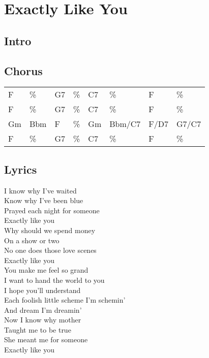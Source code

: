 \section{Exactly Like You}


\subsection*{Intro}


\subsection*{Chorus}


\begin{tabular}{l l l l l l l l}
F & \% & G7 & \% & C7 & \% & F & \% \\ 
F & \% & G7 & \% & C7 & \% & F & \% \\ 
Gm & Bbm & F & \% & Gm & Bbm/C7 & F/D7 & G7/C7 \\ 
F & \% & G7 & \% & C7 & \% & F & \% \\ 
\end{tabular}


\subsection*{Lyrics}


I know why I've waited \\ 
Know why I've been blue \\ 
Prayed each night for someone \\ 
Exactly like you \\ 

Why should we spend money \\ 
On a show or two \\ 
No one does those love scenes \\ 
Exactly like you \\ 

You make me feel so grand \\ 
I want to hand the world to you \\ 
I hope you'll understand \\ 
Each foolish little scheme I'm schemin' \\ 
And dream I'm dreamin' \\ 

Now I know why mother \\ 
Taught me to be true \\ 
She meant me for someone \\ 
Exactly like you \\ 
